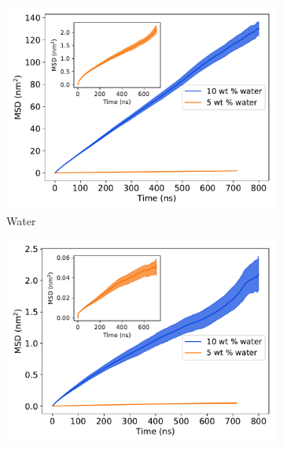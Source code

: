 \documentclass{article}
\begin{document}
  
  
  \begin{figure}[!htb]
  \centering
  \begin{subfigure}{0.45\textwidth}
  \includegraphics[width=\textwidth]{water_msd_comparison.pdf}
  \caption{Water}\label{fig:water_msd_comparison}
  \end{subfigure}
  \begin{subfigure}{0.45\textwidth}
  \includegraphics[width=\textwidth]{na_msd_comparison.pdf}

\end{subfigure}
\end{figure}
\end{document}
